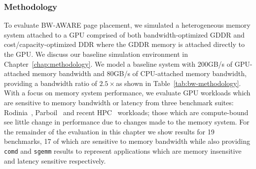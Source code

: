 \subsubsection{Methodology}
To evaluate BW-AWARE page placement, we simulated a heterogeneous memory system
attached to a GPU comprised of both bandwidth-optimized GDDR and
cost/capacity-optimized DDR where the GDDR memory is attached directly to the
GPU\@.  We discuss our baseline simulation environment in
Chapter~\ref{chap:methodology}.
We model a baseline system with 200GB/s of GPU-attached memory bandwidth and
80GB/s of CPU-attached memory bandwidth, providing a bandwidth ratio of
$2.5\times$\@ as shown in Table~\ref{tab:bw-methodology}.
With a focus on memory system performance, we evaluate GPU workloads which are
sensitive to memory bandwidth or latency from three benchmark suites:
Rodinia~\cite{Che2009}, Parboil~\cite{Parboil} and recent
HPC~\cite{comd,cns,minife,xsbench} workloads; those which are compute-bound see
little change in performance due to changes made to the memory system.  For the
remainder of the evaluation in this chapter we show results for 19 benchmarks,
17 of which are sensitive to memory bandwidth while also providing {\tt comd}
and {\tt sgemm} results to represent applications which are memory insensitive
and latency sensitive respectively.


